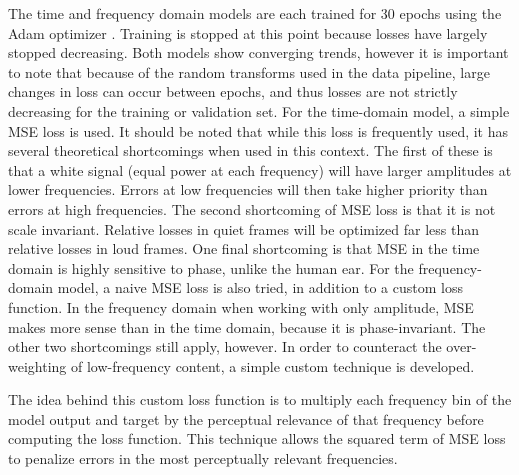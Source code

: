  The time and frequency domain models are each trained for 30 epochs using the Adam optimizer . Training is stopped at this point because losses have largely stopped decreasing. Both models show converging trends, however it is important to note that because of the random transforms used in the data pipeline, large changes in loss can occur between epochs, and thus losses are not strictly decreasing for the training or validation set. For the time-domain model, a simple \ac{MSE} loss is used. It should be noted that while this loss is frequently used, it has several theoretical shortcomings when used in this context. The first of these is that a white signal (equal power at each frequency) will have larger amplitudes at lower frequencies. Errors at low frequencies will then take higher priority than errors at high frequencies. The second shortcoming of \ac{MSE} loss is that it is not scale invariant. Relative losses in quiet frames will be optimized far less than relative losses in loud frames. One final shortcoming is that \ac{MSE} in the time domain is highly sensitive to phase, unlike the human ear. For the frequency-domain model, a naive \ac{MSE} loss is also tried, in addition to a custom loss function. In the frequency domain when working with only amplitude, \ac{MSE} makes more sense than in the time domain, because it is phase-invariant. The other two shortcomings still apply, however. In order to counteract the over-weighting of low-frequency content, a simple custom technique is developed.  

The idea behind this custom loss function is to multiply each frequency bin of the model output and target by the perceptual relevance of that frequency before computing the loss function. This technique allows the squared term of \ac{MSE} loss to penalize errors in the most perceptually relevant frequencies.
